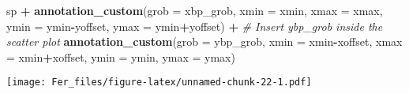 \documentclass[
]{article}
\newenvironment{Shaded}{\begin{snugshade}}{\end{snugshade}}
\newcommand{\AttributeTok}[1]{\textcolor[rgb]{0.13,0.29,0.53}{#1}}
\newcommand{\CommentTok}[1]{\textcolor[rgb]{0.56,0.35,0.01}{\textit{#1}}}
\newcommand{\FunctionTok}[1]{\textcolor[rgb]{0.13,0.29,0.53}{\textbf{#1}}}
\newcommand{\NormalTok}[1]{#1}
\newcommand{\SpecialCharTok}[1]{\textcolor[rgb]{0.81,0.36,0.00}{\textbf{#1}}}
\begin{document}
\begin{Shaded}
\begin{Highlighting}[]
\NormalTok{sp }\SpecialCharTok{+} \FunctionTok{annotation\_custom}\NormalTok{(}\AttributeTok{grob =}\NormalTok{ xbp\_grob, }\AttributeTok{xmin =}\NormalTok{ xmin, }\AttributeTok{xmax =}\NormalTok{ xmax, }
                       \AttributeTok{ymin =}\NormalTok{ ymin}\SpecialCharTok{{-}}\NormalTok{yoffset, }\AttributeTok{ymax =}\NormalTok{ ymin}\SpecialCharTok{+}\NormalTok{yoffset) }\SpecialCharTok{+}
  \CommentTok{\# Insert ybp\_grob inside the scatter plot}
  \FunctionTok{annotation\_custom}\NormalTok{(}\AttributeTok{grob =}\NormalTok{ ybp\_grob,}
                    \AttributeTok{xmin =}\NormalTok{ xmin}\SpecialCharTok{{-}}\NormalTok{xoffset, }\AttributeTok{xmax =}\NormalTok{ xmin}\SpecialCharTok{+}\NormalTok{xoffset, }
                    \AttributeTok{ymin =}\NormalTok{ ymin, }\AttributeTok{ymax =}\NormalTok{ ymax)}
\end{Highlighting}
\end{Shaded}

\texttt{[image: Fer\_files/figure-latex/unnamed-chunk-22-1.pdf]}
\end{document}
